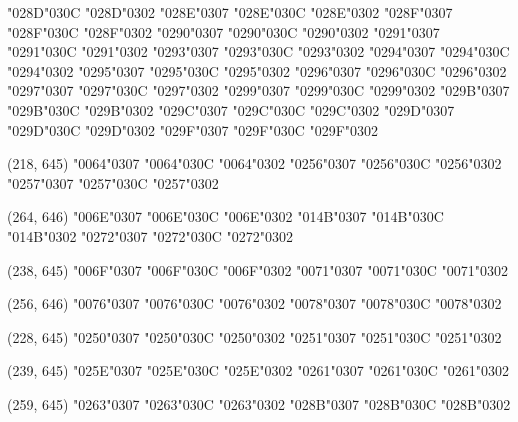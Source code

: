 \char"028D\cgj\char"030C \char"028D\cgj\char"0302 \char"028E\cgj\char"0307 \char"028E\cgj\char"030C \char"028E\cgj\char"0302 \char"028F\cgj\char"0307 \char"028F\cgj\char"030C \char"028F\cgj\char"0302 \char"0290\cgj\char"0307 \char"0290\cgj\char"030C \char"0290\cgj\char"0302 \char"0291\cgj\char"0307 \char"0291\cgj\char"030C \char"0291\cgj\char"0302 \char"0293\cgj\char"0307 \char"0293\cgj\char"030C \char"0293\cgj\char"0302 \char"0294\cgj\char"0307 \char"0294\cgj\char"030C \char"0294\cgj\char"0302 \char"0295\cgj\char"0307 \char"0295\cgj\char"030C \char"0295\cgj\char"0302 \char"0296\cgj\char"0307 \char"0296\cgj\char"030C \char"0296\cgj\char"0302 \char"0297\cgj\char"0307 \char"0297\cgj\char"030C \char"0297\cgj\char"0302 \char"0299\cgj\char"0307 \char"0299\cgj\char"030C \char"0299\cgj\char"0302 \char"029B\cgj\char"0307 \char"029B\cgj\char"030C \char"029B\cgj\char"0302 \char"029C\cgj\char"0307 \char"029C\cgj\char"030C \char"029C\cgj\char"0302 \char"029D\cgj\char"0307 \char"029D\cgj\char"030C \char"029D\cgj\char"0302 \char"029F\cgj\char"0307 \char"029F\cgj\char"030C \char"029F\cgj\char"0302

(218, 645) \char"0064\cgj\char"0307 \char"0064\cgj\char"030C \char"0064\cgj\char"0302 \char"0256\cgj\char"0307 \char"0256\cgj\char"030C \char"0256\cgj\char"0302 \char"0257\cgj\char"0307 \char"0257\cgj\char"030C \char"0257\cgj\char"0302

(264, 646) \char"006E\cgj\char"0307 \char"006E\cgj\char"030C \char"006E\cgj\char"0302 \char"014B\cgj\char"0307 \char"014B\cgj\char"030C \char"014B\cgj\char"0302 \char"0272\cgj\char"0307 \char"0272\cgj\char"030C \char"0272\cgj\char"0302

(238, 645) \char"006F\cgj\char"0307 \char"006F\cgj\char"030C \char"006F\cgj\char"0302 \char"0071\cgj\char"0307 \char"0071\cgj\char"030C \char"0071\cgj\char"0302

(256, 646) \char"0076\cgj\char"0307 \char"0076\cgj\char"030C \char"0076\cgj\char"0302 \char"0078\cgj\char"0307 \char"0078\cgj\char"030C \char"0078\cgj\char"0302

(228, 645) \char"0250\cgj\char"0307 \char"0250\cgj\char"030C \char"0250\cgj\char"0302 \char"0251\cgj\char"0307 \char"0251\cgj\char"030C \char"0251\cgj\char"0302

(239, 645) \char"025E\cgj\char"0307 \char"025E\cgj\char"030C \char"025E\cgj\char"0302 \char"0261\cgj\char"0307 \char"0261\cgj\char"030C \char"0261\cgj\char"0302

(259, 645) \char"0263\cgj\char"0307 \char"0263\cgj\char"030C \char"0263\cgj\char"0302 \char"028B\cgj\char"0307 \char"028B\cgj\char"030C \char"028B\cgj\char"0302

